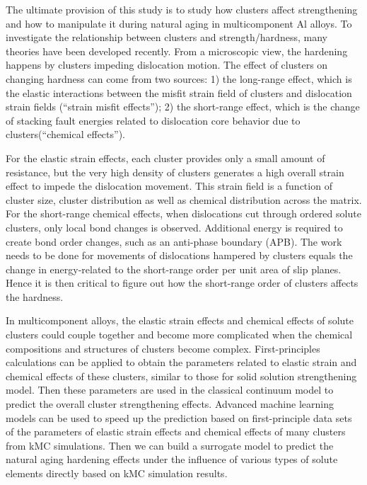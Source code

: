 The ultimate provision of this study is to study how clusters affect strengthening and how to manipulate it during natural aging in multicomponent Al alloys. To investigate the relationship between clusters and strength/hardness, many theories have been developed recently\cite{yasi2010first, starink2009thermodynamics, curtin2006predictive}. From a microscopic view, the hardening happens by clusters impeding dislocation motion. The effect of clusters on changing hardness can come from two sources: 1) the long-range effect, which is the elastic interactions between the misfit strain field of clusters and dislocation strain fields (``strain misfit effects''); 2) the short-range effect, which is the change of stacking fault energies related to dislocation core behavior due to clusters(``chemical effects'')\cite{yasi2010first}.


For the elastic strain effects, each cluster provides only a small amount of resistance, but the very high density of clusters generates a high overall strain effect to impede the dislocation movement. This strain field is a function of cluster size, cluster distribution as well as chemical distribution across the matrix. For the short-range chemical effects, when dislocations cut through ordered solute clusters, only local bond changes is observed. Additional energy is required to create bond order changes, such as an anti-phase boundary (APB). The work needs to be done for movements of dislocations hampered by clusters equals the change in energy-related to the short-range order per unit area of slip planes. Hence it is then critical to figure out how the short-range order of clusters affects the hardness.

In multicomponent alloys, the elastic strain effects and chemical effects of solute clusters could couple together and become more complicated when the chemical compositions and structures of clusters become complex. First-principles calculations can be applied to obtain the parameters related to elastic strain and chemical effects of these clusters, similar to those for solid solution strengthening model\cite{yasi2010first}.  Then these parameters are used in the classical continuum model to predict the overall cluster strengthening effects. Advanced machine learning models can be used to speed up the prediction based on first-principle data sets of the parameters of elastic strain effects and chemical effects of many clusters from \ac{kMC} simulations. Then we can build a surrogate model to predict the natural aging hardening effects under the influence of various types of solute elements directly based on \ac{kMC} simulation results.

